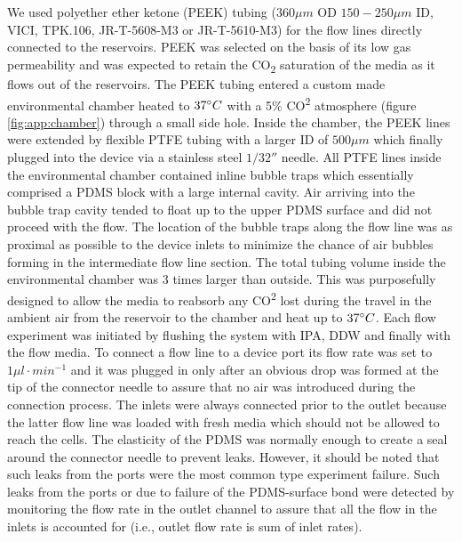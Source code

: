 We used polyether ether ketone (PEEK) tubing (\(360 \mu m\) OD \(150-250 \mu m\) ID, VICI, TPK.106, JR-T-5608-M3 or JR-T-5610-M3)
for the flow lines directly connected to the reservoirs. PEEK was selected on the basis of its low gas permeability and was expected to retain the CO\textsubscript{2} saturation of the media as it flows out of the reservoirs. The PEEK tubing entered a custom made environmental chamber heated to \(37\degree C\) with a 5\% CO\textsuperscript{2} atmosphere (figure \ref{fig:app:chamber}) through a small side hole. Inside the chamber, the PEEK lines were extended by flexible PTFE tubing with a larger ID of \(500\mu m\) which finally plugged into the device via a stainless steel \(1/32''\) needle. All PTFE lines inside the environmental chamber contained inline bubble traps which essentially comprised a PDMS block with a large internal cavity. Air arriving into the bubble trap cavity tended to float up to the upper PDMS surface and did not proceed with the flow. The location of the bubble traps along the flow line was as proximal as possible to the device inlets to minimize the chance of air bubbles forming in the intermediate flow line section. The total tubing volume inside the environmental chamber was 3 times larger than outside. This was purposefully designed to allow the media to reabsorb any CO\textsuperscript{2} lost during the travel in the ambient air from the reservoir to the chamber and heat up to \(37\degree C\). Each flow experiment was initiated by flushing the system with IPA, DDW and finally with the flow media. To connect a flow line to a device port its flow rate was set to \(1 \mu l\cdot min^{-1}\) and it was plugged in only after an obvious drop was formed at the tip of the connector needle to assure that no air was introduced during the connection process. The inlets were always connected prior to the outlet because the latter flow line was loaded with fresh media which should not be allowed to reach the cells. The elasticity of the PDMS was normally enough to create a seal around the connector needle to prevent leaks. However, it should be noted that such leaks from the ports were the most common type experiment failure. Such leaks from the ports or due to failure of the PDMS-surface bond were detected by monitoring the flow rate in the outlet channel to assure that all the flow in the inlets is accounted for (i.e., outlet flow rate is sum of inlet rates).

